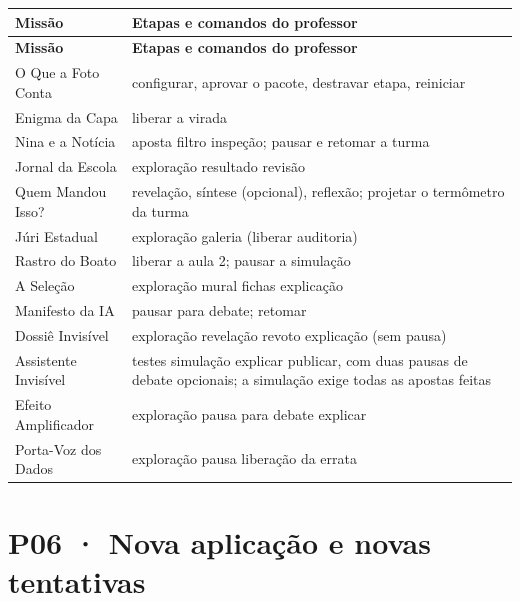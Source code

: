 \begin{center}
\footnotesize\renewcommand{\arraystretch}{1.3}
\begin{tabularx}{\linewidth}{@{}L{42mm}X@{}}
\caption{Comandos de condução, por missão}\label{tab:p05}\\
\toprule
\textbf{Missão} & \textbf{Etapas e comandos do professor}\\
\midrule
\endfirsthead
\toprule
\textbf{Missão} & \textbf{Etapas e comandos do professor}\\
\midrule
\endhead
O Que a Foto Conta & configurar, aprovar o pacote, destravar etapa, reiniciar\\
Enigma da Capa & liberar a virada\\
Nina e a Notícia & aposta \seta{} filtro \seta{} inspeção; pausar e retomar a turma\\
Jornal da Escola & exploração \seta{} resultado \seta{} revisão\\
Quem Mandou Isso? & revelação, síntese (opcional), reflexão; projetar o termômetro da turma\\
Júri Estadual & exploração \seta{} galeria (liberar auditoria)\\
Rastro do Boato & liberar a aula 2; pausar a simulação\\
A Seleção & exploração \seta{} mural \seta{} fichas \seta{} explicação\\
Manifesto da IA & pausar para debate; retomar\\
Dossiê Invisível & exploração \seta{} revelação \seta{} revoto \seta{} explicação (sem pausa)\\
Assistente Invisível & testes \seta{} simulação \seta{} explicar \seta{} publicar, com duas pausas
  de debate opcionais; a simulação exige todas as apostas feitas\\
Efeito Amplificador & exploração \seta{} pausa para debate \seta{} explicar\\
Porta-Voz dos Dados & exploração \seta{} pausa \seta{} liberação da errata\\
\bottomrule
\end{tabularx}
\end{center}

\section{P06 · Nova aplicação e novas tentativas}
\label{sec:p06}


